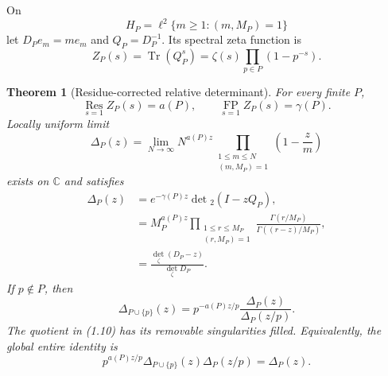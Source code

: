\documentclass[11pt]{article}
\newtheorem{theorem}{Theorem}[section]
\theoremstyle{definition}
\theoremstyle{remark}
\newcommand{\C}{\mathbb C}
\newcommand{\Res}{\operatorname*{Res}}
\newcommand{\FP}{\operatorname*{FP}}
\newcommand{\Tr}{\operatorname{Tr}}
\begin{document}
On
\[
 H_P=\ell^2\{m\geq1:(m,M_P)=1\}
\]
let $D_Pe_m=me_m$ and $Q_P=D_P^{-1}$.  Its spectral zeta function is
\begin{equation}
 Z_P(s)=\Tr(Q_P^s)=\zeta(s)\prod_{p\in P}(1-p^{-s}).       \tag{1.4}
\end{equation}

\begin{theorem}[Residue-corrected relative determinant]
\label{thm:determinant}
For every finite $P$,
\begin{equation}
 \Res_{s=1}Z_P(s)=a(P),\qquad
 \FP_{s=1}Z_P(s)=\gamma(P).                               \tag{1.5}
\end{equation}
Locally uniform limit
\begin{equation}
 \Delta_P(z)=\lim_{N\to\infty}N^{a(P)z}
 \prod_{\substack{1\leq m\leq N\\(m,M_P)=1}}
 \left(1-\frac zm\right)                                 \tag{1.6}
\end{equation}
exists on $\C$ and satisfies
\begin{align}
 \Delta_P(z)
 &=e^{-\gamma(P)z}\det{}_2(I-zQ_P),                       \tag{1.7}\\
 &=M_P^{a(P)z}
 \prod_{\substack{1\leq r\leq M_P\\(r,M_P)=1}}
 \frac{\Gamma(r/M_P)}{\Gamma((r-z)/M_P)},                \tag{1.8}\\
 &=\frac{\det_\zeta(D_P-z)}{\det_\zeta D_P}.             \tag{1.9}
\end{align}
If $p\notin P$, then
\begin{equation}
 \boxed{
 \Delta_{P\cup\{p\}}(z)
 =p^{-a(P)z/p}\frac{\Delta_P(z)}{\Delta_P(z/p)}.}         \tag{1.10}
\end{equation}
The quotient in (1.10) has its removable singularities filled.  Equivalently, the global
entire identity is
\[
 p^{a(P)z/p}\Delta_{P\cup\{p\}}(z)\Delta_P(z/p)=\Delta_P(z).
\]
\end{theorem}
\end{document}
